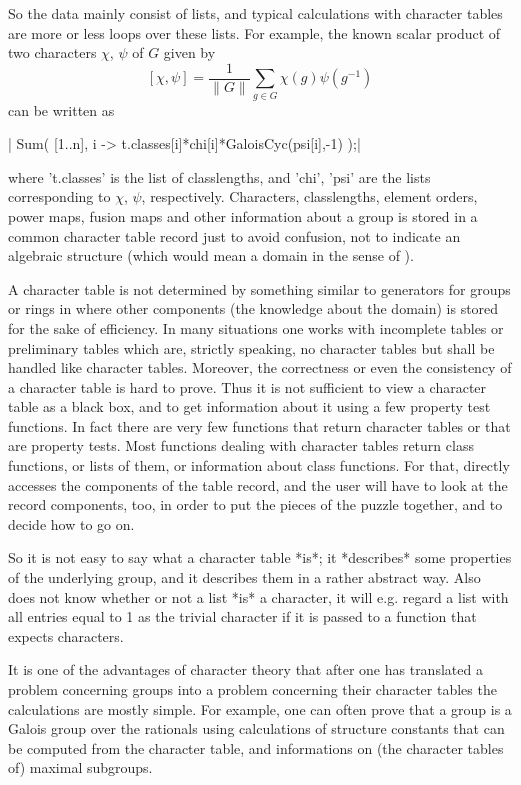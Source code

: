 So the  data  mainly consist of  lists,  and  typical  calculations  with
character tables are more or less  loops over these lists.  For  example,
the known scalar product of two characters $\chi$, $\psi$ of $G$ given by
\[ [\chi,\psi] = \frac{1}{\|G\|}  \sum_{g\in G}  \chi(g)  \psi(g^{-1}) \]
can be written as

|    Sum( [1..n], i -> t.classes[i]*chi[i]*GaloisCyc(psi[i],-1) );|

where 't.classes' is the  list  of classlengths, and 'chi', 'psi' are the
lists  corresponding  to   $\chi$,  $\psi$,  respectively.    Characters,
classlengths,  element  orders,  power  maps,  fusion   maps  and   other
information about a  group is stored in  a  common character table record
just  to avoid  confusion, not to  indicate an algebraic structure (which
would mean a domain in the sense of {\GAP}).

A character table is  not determined  by something similar  to generators
for groups or rings in {\GAP} where other components (the knowledge about
the domain) is stored for the sake of efficiency.  In many situations one
works  with incomplete tables or preliminary tables which  are,  strictly
speaking, no character tables but shall be handled like character tables.
Moreover, the correctness or even the consistency of a character table is
hard to prove.  Thus  it is not sufficient to view a character table as a
black box, and to  get information  about it using a  few  property  test
functions.  In fact  there are very few  functions that return  character
tables  or that  are property tests.  Most {\GAP} functions dealing  with
character tables return class functions, or lists of them, or information
about class functions.  For that, {\GAP} directly accesses the components
of  the  table  record, and  the  user will  have to  look  at the record
components, too, in order to  put  the pieces of the puzzle together, and
to decide how to go on.

So it is not easy to say what a character table *is*; it *describes* some
properties of  the  underlying group, and it describes  them in  a rather
abstract way.   Also  {\GAP} does not  know whether  or not a list *is* a
character,  it will e.g. regard a list with all entries equal to 1 as the
trivial character if it is passed to a function that expects characters.

It is  one of  the advantages  of  character theory that  after  one  has
translated  a problem concerning groups into  a  problem concerning their
character  tables the calculations are mostly  simple.  For  example, one
can often prove that a group is  a Galois group  over the rationals using
calculations  of  structure  constants  that  can be  computed  from  the
character table, and  informations on  (the character tables of)  maximal
subgroups.

